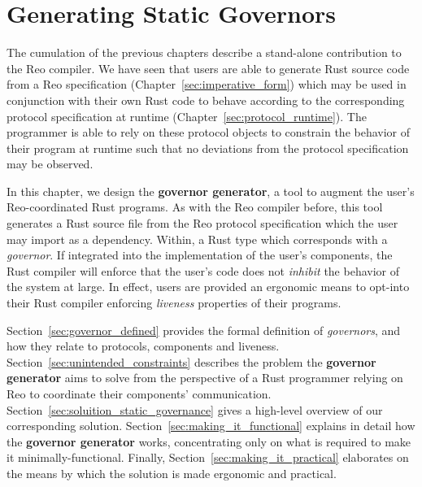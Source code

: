 \chapter{Generating Static Governors}
\label{sec:api}

The cumulation of the previous chapters describe a stand-alone contribution to the Reo compiler. We have seen that users are able to generate Rust source code from a Reo specification (Chapter~\ref{sec:imperative_form}) which may be used in conjunction with their own Rust code to behave according to the corresponding protocol specification at runtime (Chapter~\ref{sec:protocol_runtime}). The programmer is able to rely on these protocol objects to constrain the behavior of their program at runtime such that no deviations from the protocol specification may be observed. 

In this chapter, we design the \textbf{governor generator}, a tool to augment the user's Reo-coordinated Rust programs. As with the Reo compiler before, this tool generates a Rust source file from the Reo protocol specification which the user may import as a dependency. Within, a Rust type which corresponds with a \textit{governor}. If integrated into the implementation of the user's components, the Rust compiler will enforce that the user's code does not \textit{inhibit} the behavior of the system at large. In effect, users are provided an ergonomic means to opt-into their Rust compiler enforcing \textit{liveness} properties of their programs. 

Section~\ref{sec:governor_defined} provides the formal definition of \textit{governors}, and how they relate to protocols, components and liveness. Section~\ref{sec:unintended_constraints} describes the problem the \textbf{governor generator} aims to solve from the perspective of a Rust programmer relying on Reo to coordinate their components' communication. Section~\ref{sec:soluition_static_governance} gives a high-level overview of our corresponding solution. Section~\ref{sec:making_it_functional} explains in detail how the \textbf{governor generator} works, concentrating only on what is required to make it minimally-functional. Finally, Section~\ref{sec:making_it_practical} elaborates on the means by which the solution is made ergonomic and practical.

